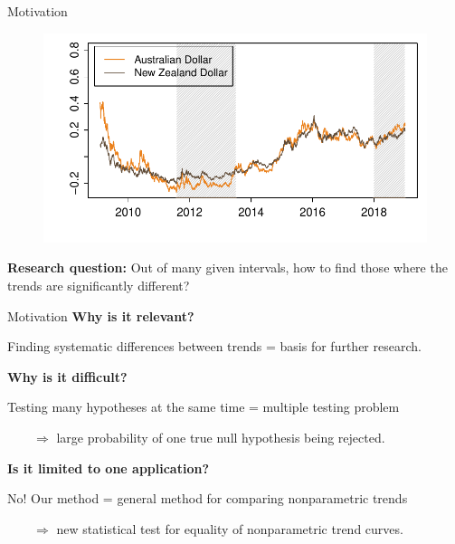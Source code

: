 \documentclass[10pt]{beamer}
\begin{document}
\begin{frame}{Motivation}
{\begin{figure}
  	\end{figure}}	
	{\onslide<4->
	\vspace{-46,81mm}
	\begin{figure}
    		\centering
    		\includegraphics[height=0.45\textheight]{plots/exchange_rates_2.pdf}
  	\end{figure}}	
\vspace{-3mm}
{\textbf{Research question:}
	Out of many given intervals, how to find those where the trends are significantly different?}


\end{frame}

\begin{frame}{Motivation}
\vspace{-4mm}
\textbf{Why is it relevant?}

Finding systematic differences between trends = basis for further research.\pause


\vspace{3mm}

\textbf{Why is it difficult?}	

Testing many hypotheses at the same time = multiple testing problem

$\quad \quad \Rightarrow$ large probability of one true null hypothesis being rejected.\pause

\vspace{3mm}

\textbf{Is it limited to one application?}

No! Our method = general method for comparing nonparametric trends

$\quad \quad \Rightarrow$ new statistical test for equality of nonparametric trend curves.
 
\end{frame}
\end{document}
